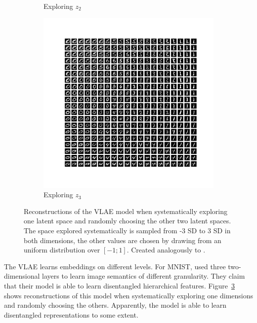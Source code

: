\documentclass[11pt]{article}
\begin{document}
\begin{figure}[t]
\begin{subfigure}{0.3\textwidth}
            \caption{Exploring $z_{2}$}
            \label{subfig:vlae_plots2}
        \end{subfigure}
        \hfill
        \begin{subfigure}{0.3\textwidth}
            \centering
            \includegraphics[width=\textwidth]{images/vlae_plots3.png}
            \caption{Exploring $z_3$}
            \label{subfig:vlae_plots3}
        \end{subfigure}
        \caption{Reconstructions of the VLAE model when systematically exploring one latent space and randomly choosing the other two latent spaces. The space explored systematically is sampled from -3 SD to 3 SD in both dimensions, the other values are chosen by drawing from an uniform distribution over $[-1; 1]$. Created analogously to \citet[Figure 5]{zhao2017learning}.}
        \label{fig:vlae_plots}
    \end{figure}
    The VLAE learns embeddings on different levels.
    For MNIST, \citet{zhao2017learning} used three two-dimensional layers to learn image semantics of different granularity.
    They claim that their model is able to learn disentangled hierarchical features.
    Figure~\ref{fig:vlae_plots} shows reconstructions of this model when systematically exploring one dimensions and randomly choosing the others.
    Apparently, the model is able to learn disentangled representations to some extent.
\end{document}
